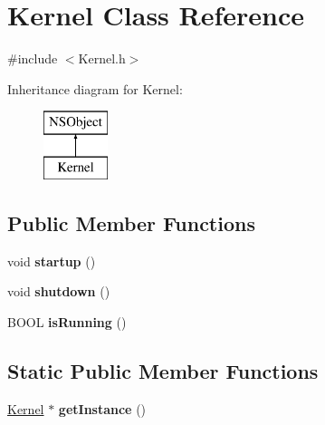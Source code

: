 \hypertarget{interface_kernel}{
\section{\-Kernel \-Class \-Reference}
\label{interface_kernel}
}


{\ttfamily \#include $<$\-Kernel.\-h$>$}

\-Inheritance diagram for \-Kernel\-:\begin{figure}[H]
\begin{center}
\leavevmode
\includegraphics[height=2.000000cm]{interface_kernel}
\end{center}
\end{figure}
\subsection*{\-Public \-Member \-Functions}
\begin{DoxyCompactItemize}
\item 
\hypertarget{interface_kernel_a7c9e4e1acc2046837b1c7f7664ba8ffe}{
void {\bfseries startup} ()}
\label{interface_kernel_a7c9e4e1acc2046837b1c7f7664ba8ffe}

\item 
\hypertarget{interface_kernel_af706eadcad5a5e8c1c11879de8cbf01b}{
void {\bfseries shutdown} ()}
\label{interface_kernel_af706eadcad5a5e8c1c11879de8cbf01b}

\item 
\hypertarget{interface_kernel_afcd6f5c3029a1c5c7e52f36191fd48cc}{
\-B\-O\-O\-L {\bfseries is\-Running} ()}
\label{interface_kernel_afcd6f5c3029a1c5c7e52f36191fd48cc}

\end{DoxyCompactItemize}
\subsection*{\-Static \-Public \-Member \-Functions}
\begin{DoxyCompactItemize}
\item 
\hypertarget{interface_kernel_a52170c319bada5d7ab2a918f01830cb7}{
\hyperlink{interface_kernel}{\-Kernel} $\ast$ {\bfseries get\-Instance} ()}
\label{interface_kernel_a52170c319bada5d7ab2a918f01830cb7}

\end{DoxyCompactItemize}


